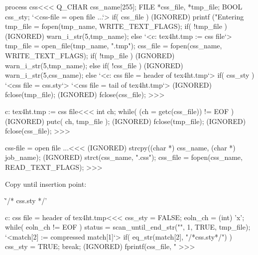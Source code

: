 {%




\<process css\><<<
{
                               Q_CHAR   css_name[255];
                               FILE   *css_file, *tmp_file;
                               BOOL   css_sty;
   `<css-file = open file ...`>
   if( css_file ){
      (IGNORED) printf ("Entering %
      tmp_file = fopen(tmp_name, WRITE_TEXT_FLAGS);
      if( !tmp_file ) {
         (IGNORED) warn_i_str(5,tmp_name);
      } else { `<c: tex4ht.tmp := css file`> }
      tmp_file = open_file(tmp_name, ".tmp");
      css_file = fopen(css_name, WRITE_TEXT_FLAGS);
      if( !tmp_file ) {
         (IGNORED) warn_i_str(5,tmp_name);
      } else if( !css_file ) {
         (IGNORED) warn_i_str(5,css_name);
      } else { 
        `<c: css file = header of tex4ht.tmp`>
        if( css_sty ){
           `<css file = css.sty`>
           `<css file = tail of tex4ht.tmp`>
        }
      }
      (IGNORED) fclose(tmp_file);
      (IGNORED) fclose(css_file);
}  }
>>>


\<c: tex4ht.tmp := css file\><<<
                   int ch;
while( (ch = getc(css_file)) != EOF ) {
  (IGNORED) putc( ch, tmp_file );        
}
(IGNORED) fclose(tmp_file);
(IGNORED) fclose(css_file);
>>>


\<css-file = open file ...\><<<
(IGNORED) strcpy((char *)  css_name, (char *) job_name);
(IGNORED) strct(css_name, ".css");
css_file = fopen(css_name, READ_TEXT_FLAGS);  
>>>


Copy until insertion point:

\`'/* css.sty */'

\<c: css file = header of tex4ht.tmp\><<<
css_sty = FALSE;
eoln_ch = (int) 'x';
while( eoln_ch != EOF ) {
  status = scan_until_end_str("", 1, TRUE, tmp_file);
  `<match[2] := compressed match[1]`>
  if( eq_str(match[2], "/*css.sty*/") ){ css_sty = TRUE;  break; }
  (IGNORED) fprintf(css_file, "%
}
>>>

}
